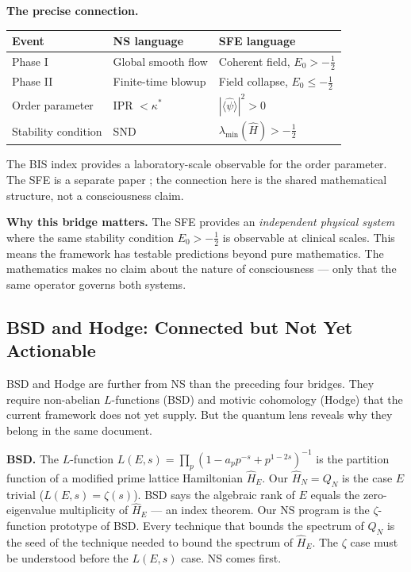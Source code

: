 \documentclass[12pt]{article}
\newcommand{\half}{\tfrac{1}{2}}
\begin{document}
\begin{tcolorbox}[keybox]
\textbf{The precise connection.}
\begin{center}
\renewcommand{\arraystretch}{1.4}
\small
\begin{tabular}{@{}lll@{}}
\toprule
\textbf{Event} & \textbf{NS language} & \textbf{SFE language} \\
\midrule
Phase I & Global smooth flow & Coherent field, $E_0 > -\half$ \\
Phase II & Finite-time blowup & Field collapse, $E_0 \le -\half$ \\
Order parameter & IPR $< \kappa^*$ & $|\langle\hat{\psi}\rangle|^2 > 0$ \\
Stability condition & SND & $\lambda_{\min}(\hat{H}) > -\half$ \\
\bottomrule
\end{tabular}
\end{center}
The BIS index provides a laboratory-scale observable for the order parameter.
The SFE is a separate paper \cite{Harmonic2025}; the connection here is
the shared mathematical structure, not a consciousness claim.
\end{tcolorbox}

\textbf{Why this bridge matters.}
The SFE provides an \emph{independent physical system} where the same
stability condition $E_0 > -\half$ is observable at clinical scales.
This means the framework has testable predictions beyond pure mathematics.
The mathematics makes no claim about the nature of consciousness ---
only that the same operator governs both systems.

\subsection{BSD and Hodge: Connected but Not Yet Actionable}
\label{sec:bridge-deeper}

BSD and Hodge are further from NS than the preceding four bridges.
They require non-abelian $L$-functions (BSD) and motivic cohomology (Hodge)
that the current framework does not yet supply.
But the quantum lens reveals why they belong in the same document.

\medskip
\textbf{BSD.}
The $L$-function $L(E,s) = \prod_p(1-a_pp^{-s}+p^{1-2s})^{-1}$
is the partition function of a modified prime lattice Hamiltonian $\hat{H}_E$.
Our $\hat{H}_N = Q_N$ is the case $E$ trivial ($L(E,s) = \zeta(s)$).
BSD says the algebraic rank of $E$ equals the zero-eigenvalue multiplicity
of $\hat{H}_E$ --- an index theorem.
Our NS program is the $\zeta$-function prototype of BSD.
Every technique that bounds the spectrum of $Q_N$ is the seed
of the technique needed to bound the spectrum of $\hat{H}_E$.
The $\zeta$ case must be understood before the $L(E,s)$ case.
NS comes first.
\end{document}
